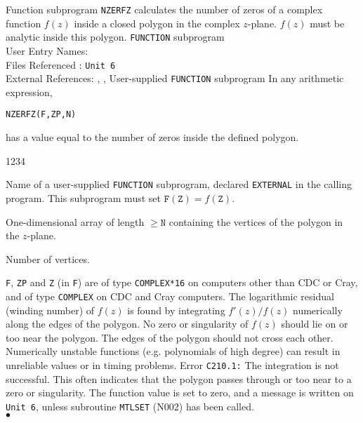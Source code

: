               
         
\Submitter{}                    
Function subprogram {\tt NZERFZ} calculates the number of zeros
of a complex function $f(z)$ inside a closed polygon in the complex
$z$-plane. $f(z)$ must be analytic inside this polygon.
\Structure
{\tt FUNCTION} subprogram \\
User Entry Names:   \\
Files Referenced : {\tt Unit 6} \\
External References: , ,
User-supplied {\tt FUNCTION} subprogram
\Usage
In any arithmetic expression,
\begin{center}
{\tt NZERFZ(F,ZP,N)}
\end{center}
has a value equal to the number of zeros inside the defined polygon.
\begin{DLtt}{1234}
\item[F] Name of a user-supplied {\tt FUNCTION} subprogram, declared
{\tt EXTERNAL} in the calling program. This subprogram must set
$\mathtt{F(Z)}= f(\mathtt{Z})$.
\item[ZP] One-dimensional array of length $\geq \mathtt{N}$ containing
the vertices of the polygon in the $z$-plane.
\item[N] Number of vertices.
\end{DLtt}
{\tt F}, {\tt ZP} and {\tt Z} (in {\tt F}) are of type {\tt COMPLEX*16}
on computers other than CDC or Cray, and of type {\tt COMPLEX}
on CDC and Cray computers.
\Method
The logarithmic residual (winding number) of $f(z)$ is found by
integrating $f'(z)/f(z)$ numerically along the edges of the polygon.
\Notes
No zero or singularity of $f(z)$ should lie on or too near the polygon.
The edges of the polygon should not cross each other.
Numerically unstable functions (e.g. polynomials of high degree)
can result in unreliable values or in timing problems.
\Errorh
Error {\tt C210.1:} The integration is not successful.
This often indicates that the polygon passes through or too
near to a zero or singularity. The function value is set to zero, and
a message is written on {\tt Unit 6}, unless subroutine {\tt MTLSET}
(N002) has been called.
\\ $\bullet$
